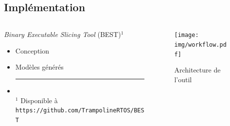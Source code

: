 \documentclass[final]{beamer}
\begin{document}
\begin{frame}
    \vspace{1cm}
    \section{Implémentation}

    \begin{columns}[t]
      \begin{column}{.45\linewidth}
        \begin{block}{\emph{Binary Executable Slicing Tool} (BEST)$^1$}
          \begin{itemize}
            \item Conception
          \end{itemize}
          
          \vspace{1em}
          \begin{itemize}
              \item Modèles générés
          \end{itemize}

          \vspace{1em}
          \begin{itemize}
            \item[] \rule{0.5\textwidth}{.4pt}\small\\
              $^1$ Disponible à \texttt{https://github.com/TrampolineRTOS/BEST}
          \end{itemize}
        \end{block}
      \end{column}
      \begin{column}{.45\linewidth}
        \begin{figure}
          \centering
          \texttt{[image: img/workflow.pdf]}
          \caption{Architecture de l'outil}
          \label{fig:tool}
        \end{figure}
      \end{column}
    \end{columns}


\end{frame}
\end{document}
